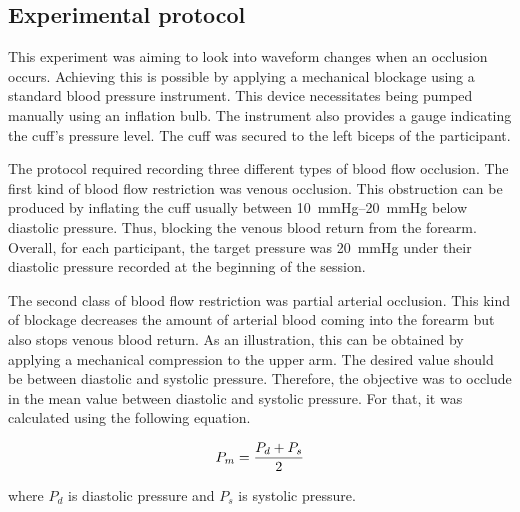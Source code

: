 
\subsection{Experimental protocol}
\label{section4.1.3}

This experiment was aiming to look into waveform changes when an occlusion occurs. Achieving this is possible by applying a mechanical blockage using a standard blood pressure instrument. This device necessitates being pumped manually using an inflation bulb. The instrument also provides a gauge indicating the cuff's pressure level. The cuff was secured to the left biceps of the participant. 

The protocol required recording three different types of blood flow occlusion. The first kind of blood flow restriction was venous occlusion.  This obstruction can be produced by inflating the cuff usually between \SIrange{10}{20}{\mmHg} below diastolic pressure. Thus, blocking the venous blood return from the forearm.  Overall, for each participant, the target pressure was \SI{20}{\mmHg} under their diastolic pressure recorded at the beginning of the session. 

The second class of blood flow restriction was partial arterial occlusion. This kind of blockage decreases the amount of arterial blood coming into the forearm but also stops venous blood return. As an illustration, this can be obtained by applying a mechanical compression to the upper arm. The desired value should be between diastolic and systolic pressure. Therefore, the objective was to occlude in the mean value between diastolic and systolic pressure. For that, it was calculated using the following equation.


\begin{align}
	\label{eq:meanpressure}
	P_m = \frac{P_d + P_s}{2} \tagaddtext{[\si{\mmHg}]}
\end{align}

where $P_d$ is diastolic pressure and $P_s$ is systolic pressure. 

